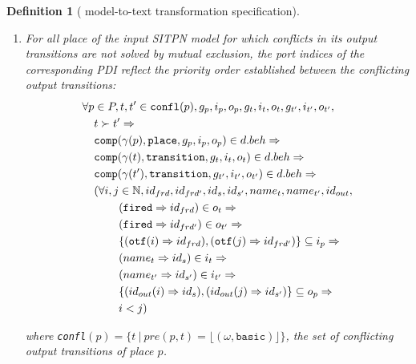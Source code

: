 \documentclass[pdflatex,sn-mathphys]{sn-jnl}%
\theoremstyle{thmstyleone}%
\theoremstyle{thmstyletwo}%
\theoremstyle{thmstylethree}%
\newtheorem{definition}{Definition}%
\begin{document}
\begin{definition}[\hilecop{} model-to-text transformation specification]
  \begin{enumerate}[resume]
  \item\label{it:port-indices-ordering} For all place of the input
    SITPN model for which conflicts in its output transitions are not
    solved by mutual exclusion, the port indices of the corresponding
    PDI reflect the priority order established between the conflicting
    output transitions:
    \begin{equation*}
      \begin{aligned}[t]
        \forall{}p&\in{}P,t,t'\in{}\mathtt{confl}(p),g_p,i_p,o_p,g_t,i_t,o_t,g_{t'},i_{t'},o_{t'}, \\
                  & t\succ{}t'\Rightarrow\\
                  & \mathtt{comp}(\gamma(p),\mathtt{place},g_p,i_p,o_p)\in{}d.beh\Rightarrow \\
                  & \mathtt{comp}(\gamma(t),\mathtt{transition},g_{t},i_{t},o_{t})\in{}d.beh\Rightarrow \\
                  & \mathtt{comp}(\gamma(t'),\mathtt{transition},g_{t'},i_{t'},o_{t'})\in{}d.beh\Rightarrow \\
                  &
                    \begin{aligned}[t]
                      (\forall{}i,j&\in\mathbb{N},id_{frd},id_{frd'},id_{s},id_{s'},name_t,name_{t'},id_{out}, \\
                                   & (\mathtt{fired}\Rightarrow{}id_{frd})\in{}o_t\Rightarrow \\
                                   & (\mathtt{fired}\Rightarrow{}id_{frd'})\in{}o_{t'}\Rightarrow \\
                                   & \{(\mathtt{otf}(i)\Rightarrow{}id_{frd}),(\mathtt{otf}(j)\Rightarrow{}id_{frd'})\}\subseteq{}i_p\Rightarrow \\
                                   & (name_t\Rightarrow{}id_{s})\in{}i_t\Rightarrow \\
                                   & (name_{t'}\Rightarrow{}id_{s'})\in{}i_{t'}\Rightarrow \\
                                   & \{(id_{out}(i)\Rightarrow{}id_s),(id_{out}(j)\Rightarrow{}id_{s'})\}\subseteq{}o_p\Rightarrow \\
                                   & i<j) \\
                    \end{aligned} \\
      \end{aligned}
    \end{equation*}

    where
    \texttt{confl}$(p)=\{t~\vert~pre(p,t)=\lfloor(\omega,\mathtt{basic})\rfloor\}$,
    the set of conflicting output transitions of place $p$.
  \end{enumerate}


\end{definition}
\end{document}
